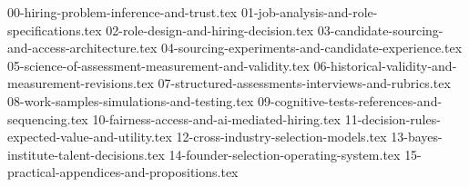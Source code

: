 {00-hiring-problem-inference-and-trust.tex}
{01-job-analysis-and-role-specifications.tex}
{02-role-design-and-hiring-decision.tex}
{03-candidate-sourcing-and-access-architecture.tex}
{04-sourcing-experiments-and-candidate-experience.tex}
{05-science-of-assessment-measurement-and-validity.tex}
{06-historical-validity-and-measurement-revisions.tex}
{07-structured-assessments-interviews-and-rubrics.tex}
{08-work-samples-simulations-and-testing.tex}
{09-cognitive-tests-references-and-sequencing.tex}
{10-fairness-access-and-ai-mediated-hiring.tex}
{11-decision-rules-expected-value-and-utility.tex}
{12-cross-industry-selection-models.tex}
{13-bayes-institute-talent-decisions.tex}
{14-founder-selection-operating-system.tex}
{15-practical-appendices-and-propositions.tex}
